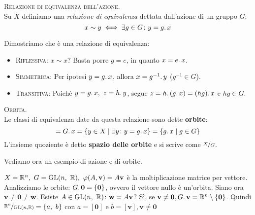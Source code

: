 \begin{define}\textsc{Relazione di equivalenza dell'azione.}\\
	Su $X$ definiamo una \textit{relazione di equivalenza} dettata dall'azione di un gruppo $G$:
	\begin{equation*}
		x\sim y\iff \exists g\in G \colon y=g\ldotp x
	\end{equation*}
\vspace{-6mm}
\end{define}
\begin{demonstration}
	Dimostriamo che è una relazione di equivalenza:
	\begin{itemize}
		\item \textsc{Riflessiva}: $x\sim x?$ Basta porre $g=e$, in quanto $x=e\ldotp x$.
		\item \textsc{Simmetrica}: Per ipotesi $y=g\ldotp x$, allora $x=g^{-1}\ldotp y$ ($g^{-1}\in G$).
		\item \textsc{Transitiva}: Poichè $y=g\ldotp x,\ z=h\ldotp y$, segue $z=h\ldotp \left(g\ldotp x\right)=(hg)\ldotp x$ e $hg\in G$.
	\end{itemize}
\vspace{-3mm}
\end{demonstration}
\begin{define}\textsc{Orbita.}\\
	Le classi di equivalenza date da questa relazione sono dette \textbf{orbite}:
		\begin{equation*}
			[x]=G\ldotp x=\{y\in X \mid \exists y \colon y=g\ldotp x\}=\{ g\ldotp x\mid g\in G \}
		\end{equation*}
	L'insieme quoziente è detto \textbf{spazio delle orbite} e si scrive come $\nicefrac{X}{G}$.
\end{define}
Vediamo ora un esempio di azione e di orbite.
\begin{example}
	 $X=\realset^n,\ G=\gl(n,\ \realset), \ \phi(A,\mathbf{v})=A\mathbf{v}$ è la moltiplicazione matrice per vettore.\newline
		Analizziamo le orbite: $G\ldotp\mathbf{0}=\{\mathbf{0}\}$, ovvero il vettore nullo è un'orbita. Siano ora $\mathbf{v\neq 0\neq w}$. Esiste $A\in\operatorname{GL}(n,\ \mathbb{R}) \colon \mathbf{w}=A\mathbf{v}$? Sì, se $\mathbf{v\neq 0}, G\ldotp\mathbf{v}=\mathbb{R}^n\setminus\{\mathbf{0}\}$.
		Quindi $\nicefrac{\mathbb{R}^n}{\operatorname{GL}(n, \mathbb{R})}=\{ a,\ b\}$ con $a=[\mathbf{0}]$ e $b=[\mathbf{v}], \mathbf{v\neq 0}$
\end{example}
